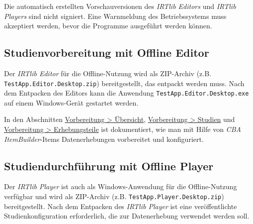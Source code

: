 \documentclass[
  letterpaper,
  DIV=11]{scrreprt}
\begin{document}
\begin{tcolorbox}[enhanced jigsaw, colbacktitle=quarto-callout-warning-color!10!white, coltitle=black, colframe=quarto-callout-warning-color-frame, leftrule=.75mm, breakable, opacitybacktitle=0.6, toprule=.15mm, title=\textcolor{quarto-callout-warning-color}{\faExclamationTriangle}\hspace{0.5em}{Warnung}, colback=white, titlerule=0mm, arc=.35mm, bottomtitle=1mm, toptitle=1mm, rightrule=.15mm, bottomrule=.15mm, left=2mm, opacityback=0]

Die automatisch erstellten Vorschauversionen des \emph{IRTlib Editors}
und \emph{IRTlib Players} sind nicht signiert. Eine Warnmeldung des
Betriebssystems muss akzeptiert werden, bevor die Programme ausgeführt
werden können.

\end{tcolorbox}

\hypertarget{studienvorbereitung-mit-offline-editor}{%
\subsection{Studienvorbereitung mit Offline
Editor}\label{studienvorbereitung-mit-offline-editor}}

Der \emph{IRTlib Editor} für die Offline-Nutzung wird als ZIP-Archiv
(z.B. \texttt{TestApp.Editor.Desktop.zip}) bereitgestellt, das entpackt
werden muss. Nach dem Entpacken des Editors kann die Anwendung
\texttt{TestApp.Editor.Desktop.exe} auf einem Windows-Gerät gestartet
werden.

In den Abschnitten
\protect\hyperlink{uxfcbersicht-schritte-zur-verwendung-von-irtlib-editor-fuxfcr-die-studienvorbereitung}{Vorbereitung
\textgreater{} Übersicht},
\protect\hyperlink{vorbereitung-studien}{Vorbereitung \textgreater{}
Studien} und
\protect\hyperlink{vorbereitung-erhebungsteile}{Vorbereitung
\textgreater{} Erhebungsteile} ist dokumentiert, wie man mit Hilfe von
\emph{CBA ItemBuilder}-Items Datenerhebungen vorbereitet und
konfiguriert.

\hypertarget{studiendurchfuxfchrung-mit-offline-player}{%
\subsection{Studiendurchführung mit Offline
Player}\label{studiendurchfuxfchrung-mit-offline-player}}

Der \emph{IRTlib Player} ist auch als Windows-Anwendung für die
Offline-Nutzung verfügbar und wird als ZIP-Archiv (z.B.
\texttt{TestApp.Player.Desktop.zip}) bereitgestellt. Nach dem Entpacken
des \emph{IRTlib Player} ist eine veröffentlichte Studienkonfiguration
erforderlich, die zur Datenerhebung verwendet werden soll.
\end{document}
